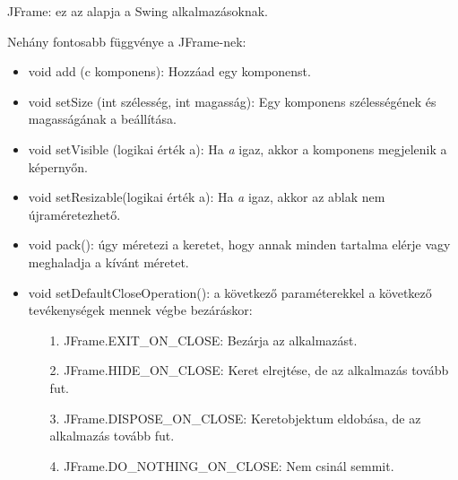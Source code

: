 
JFrame: ez az alapja a Swing alkalmazásoknak.

\medskip

\noindent Nehány fontosabb függvénye a JFrame-nek:
\begin{itemize}
    \item void add (c komponens): Hozzáad egy komponenst.
    \item void setSize (int szélesség, int magasság): Egy komponens szélességének és magasságának a beállítása.
    \item void setVisible (logikai érték a): Ha \textit{a} igaz, akkor a komponens megjelenik a képernyőn.
    \item void setResizable(logikai érték a): Ha \textit{a} igaz, akkor az ablak nem újraméretezhető.
    \item void pack(): úgy méretezi a keretet, hogy annak minden tartalma elérje vagy meghaladja a kívánt méretet.
    \item void setDefaultCloseOperation(): a következő paraméterekkel a következő tevékenységek mennek végbe bezáráskor:
    \begin{itemize}
        \item[1.] JFrame.EXIT\_ON\_CLOSE: Bezárja az alkalmazást.
        \item[2.] JFrame.HIDE\_ON\_CLOSE: Keret elrejtése, de az alkalmazás tovább fut.
        \item[3.] JFrame.DISPOSE\_ON\_CLOSE: Keretobjektum eldobása, de az alkalmazás tovább fut.
        \item[4.] JFrame.DO\_NOTHING\_ON\_CLOSE: Nem csinál semmit.
    \end{itemize}
\end{itemize}
